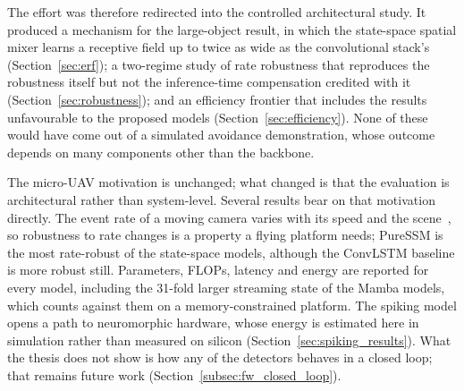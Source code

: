 \documentclass[11pt, a4paper]{report}
\begin{document}
The effort was therefore redirected into the controlled architectural study. It produced a mechanism
for the large-object result, in which the state-space spatial mixer learns a receptive field up to twice
as wide as the convolutional stack's (Section~\ref{sec:erf}); a two-regime study of rate robustness that
reproduces the robustness itself but not the inference-time compensation credited with it
(Section~\ref{sec:robustness}); and an efficiency frontier that includes the results unfavourable to the
proposed models (Section~\ref{sec:efficiency}). None of these would have come out of a simulated avoidance
demonstration, whose outcome depends on many components other than the backbone.

The micro-UAV motivation is unchanged; what changed is that the evaluation is architectural rather than
system-level. Several results bear on that motivation directly. The event rate of a moving camera varies
with its speed and the scene~\cite{gallego2020event}, so robustness to rate changes is a property a
flying platform needs; PureSSM is the most rate-robust of the state-space models, although the ConvLSTM
baseline is more robust still. Parameters, FLOPs, latency and
energy are reported for every model, including the 31-fold larger streaming state of the Mamba models,
which counts against them on a memory-constrained platform. The spiking model opens a path to
neuromorphic hardware, whose energy is estimated here in simulation rather than measured on silicon
(Section~\ref{sec:spiking_results}). What the thesis does not show is how any of the detectors behaves in
a closed loop; that remains future work (Section~\ref{subsec:fw_closed_loop}).
\end{document}
